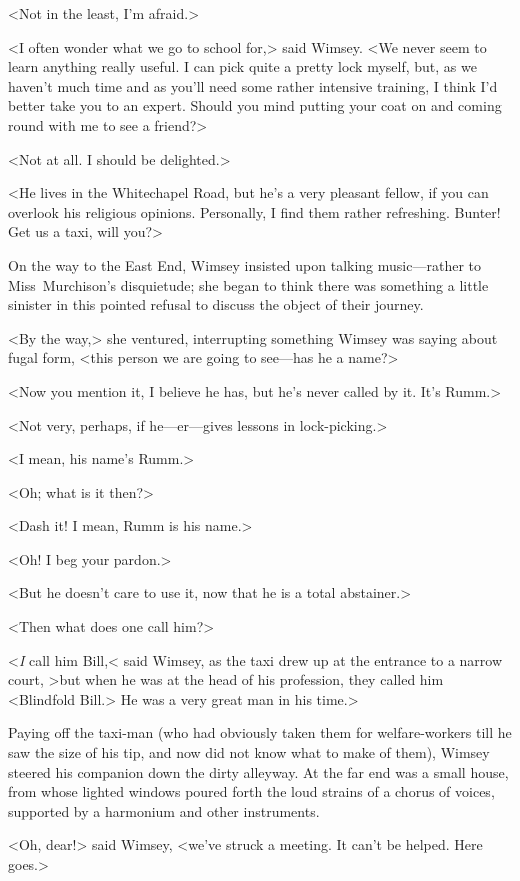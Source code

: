 <Not in the least, I'm afraid.>

<I often wonder what we go to school for,> said Wimsey. <We never seem to learn anything really useful. I can pick quite a pretty lock myself, but, as we haven't much time and as you'll need some rather intensive training, I think I'd better take you to an expert. Should you mind putting your coat on and coming round with me to see a friend?>

<Not at all. I should be delighted.>

<He lives in the Whitechapel Road, but he's a very pleasant fellow, if you can overlook his religious opinions. Personally, I find them rather refreshing. Bunter! Get us a taxi, will you?>

On the way to the East End, Wimsey insisted upon talking music—rather to Miss~Murchison's disquietude; she began to think there was something a little sinister in this pointed refusal to discuss the object of their journey.

<By the way,> she ventured, interrupting something Wimsey was saying about fugal form, <this person we are going to see—has he a name?>

<Now you mention it, I believe he has, but he's never called by it. It's Rumm.>

<Not very, perhaps, if he—er—gives lessons in lock-picking.>

<I mean, his name's Rumm.>

<Oh; what is it then?>

<Dash it! I mean, Rumm is his name.>

<Oh! I beg your pardon.>

<But he doesn't care to use it, now that he is a total abstainer.>

<Then what does one call him?>

<\emph{I} call him Bill,< said Wimsey, as the taxi drew up at the entrance to a narrow court, >but when he was at the head of his profession, they called him <Blindfold Bill.> He was a very great man in his time.>

Paying off the taxi-man (who had obviously taken them for welfare-workers till he saw the size of his tip, and now did not know what to make of them), Wimsey steered his companion down the dirty alleyway. At the far end was a small house, from whose lighted windows poured forth the loud strains of a chorus of voices, supported by a harmonium and other instruments.

<Oh, dear!> said Wimsey, <we've struck a meeting. It can't be helped. Here goes.>

